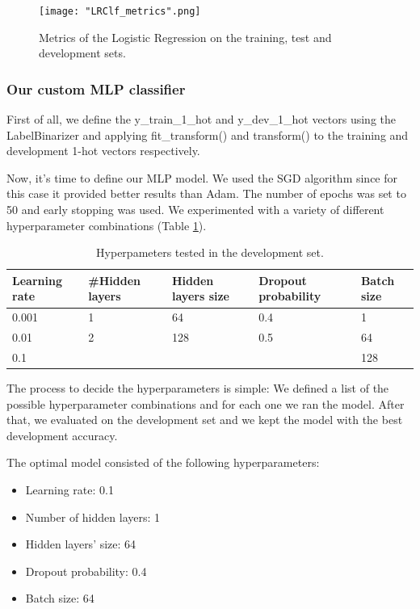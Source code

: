 \documentclass[10pt, a4paper]{article}
\begin{document}
    \begin{figure}
	    \centering
            \texttt{[image: "LRClf\_metrics".png]}
	    \caption{Metrics of the Logistic Regression on the training, test and development sets.}
	    \label{fig::LR_metrics}
     \end{figure}


    \subsubsection{Our custom MLP classifier}

    First of all, we define the y\_train\_1\_hot and y\_dev\_1\_hot vectors using the LabelBinarizer and applying fit\_transform() and transform() to the training and development 1-hot vectors respectively.
    
    Now, it’s time to define our MLP model. We used the SGD algorithm since for this case it provided better results than Adam. The number of epochs was set to 50 and early stopping was used. We experimented with a variety of different hyperparameter combinations (Table \ref{tab::ex-9-hyper}).

  


\begin{table}
    \centering
    \begin{tabular}{|l|l|l|l|l|}
    \hline
    \rowcolor{blue!25}\textbf{Learning rate} & \cellcolor{blue!25}\textbf{\#Hidden layers} & \cellcolor{blue!25}\textbf{Hidden layers size} & \cellcolor{blue!25}\textbf{Dropout probability} & \cellcolor{blue!25}\textbf{Batch size}\\
    \hline
    0.001 & 1 & 64 & 0.4 & 1\\
    \hline
    0.01 & 2 & 128 & 0.5 & 64\\
    \hline
    0.1 &  &  & & 128 \\
   
    

    \hline
    \end{tabular}
    \caption{Hyperpameters tested in the development set.}
    \label{tab::ex-9-hyper}
\end{table}

The process to decide the hyperparameters is simple: We defined a list of the possible hyperparameter combinations and for each one we ran the model. After that, we evaluated on the development set and we kept the model with the best development accuracy.


    The optimal model consisted of the following hyperparameters:
    \begin{itemize}
        \item Learning rate: 0.1
        \item Number of hidden layers: 1
        \item Hidden layers' size: 64
        \item Dropout probability: 0.4
        \item Batch size: 64
    \end{itemize}
    
\end{document}
